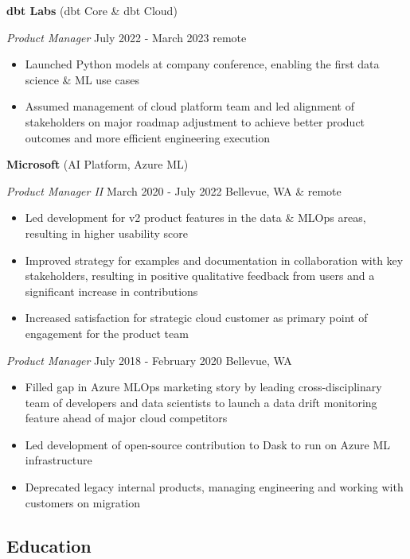 \documentclass[
  10pt,
  letterpaper,
  DIV=11,
  numbers=noendperiod]{scrartcl}
\providecommand{\tightlist}{%
  \setlength{\itemsep}{0pt}\setlength{\parskip}{0pt}}\usepackage{longtable,booktabs,array}
\begin{document}
\textbf{dbt Labs} (dbt Core \& dbt Cloud)

\emph{Product Manager} \textbar{} July 2022 - March 2023 \textbar{}
remote

\begin{itemize}
\tightlist
\item
  Launched Python models at company conference, enabling the first data
  science \& ML use cases
\item
  Assumed management of cloud platform team and led alignment of
  stakeholders on major roadmap adjustment to achieve better product
  outcomes and more efficient engineering execution
\end{itemize}

\textbf{Microsoft} (AI Platform, Azure ML)

\emph{Product Manager II} \textbar{} March 2020 - July 2022 \textbar{}
Bellevue, WA \& remote

\begin{itemize}
\tightlist
\item
  Led development for v2 product features in the data \& MLOps areas,
  resulting in higher usability score
\item
  Improved strategy for examples and documentation in collaboration with
  key stakeholders, resulting in positive qualitative feedback from
  users and a significant increase in contributions
\item
  Increased satisfaction for strategic cloud customer as primary point
  of engagement for the product team
\end{itemize}

\emph{Product Manager} \textbar{} July 2018 - February 2020 \textbar{}
Bellevue, WA

\begin{itemize}
\tightlist
\item
  Filled gap in Azure MLOps marketing story by leading
  cross-disciplinary team of developers and data scientists to launch a
  data drift monitoring feature ahead of major cloud competitors
\item
  Led development of open-source contribution to Dask to run on Azure ML
  infrastructure
\item
  Deprecated legacy internal products, managing engineering and working
  with customers on migration
\end{itemize}

\subsection{Education}\label{education}
\end{document}
